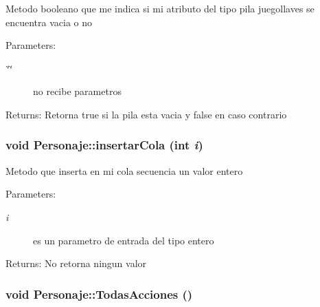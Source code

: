 Metodo booleano que me indica si mi atributo del tipo pila juegollaves se encuentra vacia o no \begin{Desc}
\item[Parameters:]
\begin{description}
\item[{\em \char`\"{}\char`\"{}}]no recibe parametros \end{description}
\end{Desc}
\begin{Desc}
\item[Returns:]Retorna true si la pila esta vacia y false en caso contrario \end{Desc}
\hypertarget{classPersonaje_66ec23478444efc795d29734cc010809}{
\subsubsection[insertarCola]{\setlength{\rightskip}{0pt plus 5cm}void Personaje::insertarCola (int {\em i})}}
\label{classPersonaje_66ec23478444efc795d29734cc010809}


Metodo que inserta en mi cola secuencia un valor entero \begin{Desc}
\item[Parameters:]
\begin{description}
\item[{\em i}]es un parametro de entrada del tipo entero \end{description}
\end{Desc}
\begin{Desc}
\item[Returns:]No retorna ningun valor \end{Desc}
\hypertarget{classPersonaje_786951aff09e227527d3da60338effec}{
\subsubsection[TodasAcciones]{\setlength{\rightskip}{0pt plus 5cm}void Personaje::TodasAcciones ()}}
\label{classPersonaje_786951aff09e227527d3da60338effec}


